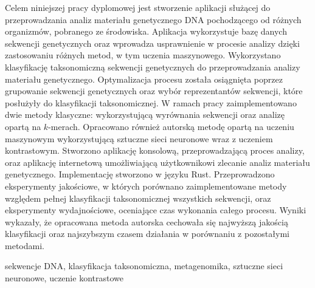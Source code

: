 \cleardoublepage{}

\abstract{}
Celem niniejszej pracy dyplomowej jest stworzenie aplikacji służącej do przeprowadzania analiz materiału genetycznego DNA pochodzącego od różnych organizmów, pobranego ze środowiska. Aplikacja wykorzystuje bazę danych sekwencji genetycznych oraz wprowadza usprawnienie w procesie analizy dzięki zastosowaniu różnych metod, w tym uczenia maszynowego.
Wykorzystano klasyfikację taksonomiczną sekwencji genetycznych do przeprowadzania analizy materiału genetycznego. Optymalizacja procesu została osiągnięta poprzez grupowanie sekwencji genetycznych oraz wybór reprezentantów sekwencji, które posłużyły do klasyfikacji taksonomicznej. W ramach pracy zaimplementowano dwie metody klasyczne: wykorzystującą wyrównania sekwencji oraz analizę opartą na $k$-merach. Opracowano również autorską metodę opartą na uczeniu maszynowym wykorzystującą sztuczne sieci neuronowe wraz z uczeniem kontrastowym. Stworzono aplikację konsolową, przeprowadzającą proces analizy, oraz aplikację internetową umożliwiającą użytkownikowi zlecanie analiz materiału genetycznego. Implementację stworzono w języku Rust.
Przeprowadzono eksperymenty jakościowe, w których porównano zaimplementowane metody względem pełnej klasyfikacji taksonomicznej wszystkich sekwencji, oraz eksperymenty wydajnościowe, oceniające czas wykonania całego procesu. Wyniki wykazały, że opracowana metoda autorska cechowała się najwyższą jakością klasyfikacji oraz najszybszym czasem działania w porównaniu z pozostałymi metodami.

\keywords{}
sekwencje DNA, klasyfikacja taksonomiczna, metagenomika, sztuczne sieci neuronowe, uczenie kontrastowe
